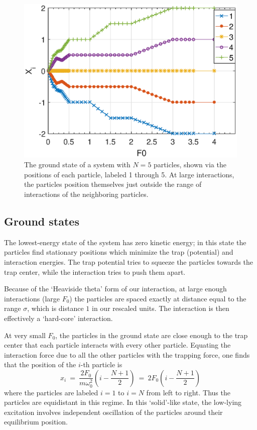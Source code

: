 \documentclass[aps,preprintnumbers,onecolumn,amsmath,amssymb,floatfix,pra]{revtex4-1}
\begin{document}
\begin{figure}[tbhp]
\centering
\includegraphics[scale=0.6]{ZhiyuPictures/N=5_GS_pre_2_rev.eps}
\caption{The ground state of a system with $N=5$ particles, shown via the positions of each
  particle, labeled 1 through 5.  At large interactions, the particles position themselves just
  outside the range of interactions of the neighboring particles.}
\label{fig:GS1}
\end{figure}




\subsection{Ground states}

The lowest-energy state of the system has zero kinetic energy; in this state the particles find
stationary positions which minimize the trap (potential) and interaction energies.  The trap
potential tries to squeeze the particles towards the trap center, while the interaction tries to push
them apart.

Because of the `Heaviside theta' form of our interaction, at large enough interactions (large $F_0$)
the particles are spaced exactly at distance equal to the range $\sigma$, which is distance $1$ in
our rescaled units.  The interaction is then effectively a `hard-core' interaction.

At very small $F_0$, the particles in the ground state are close enough to the trap center that each
particle interacts with every other particle.  Equating the interaction force due to all the other
particles with the trapping force, one finds that the position of the $i$-th particle is
\begin{equation}
x_i ~=~ \frac{2F_0}{m\omega_0^2} \left( i - \frac{N+1}{2} \right) ~=~ 2F_0 \left( i - \frac{N+1}{2} \right)
\end{equation}
where the particles are labeled $i=1$ to $i=N$ from left to right.  Thus the particles are
equidistant in this regime.  In this `solid'-like state, the low-lying
excitation involves independent oscillation of the particles around their equilibrium position.
\end{document}

